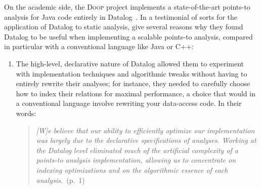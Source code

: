 
On the academic side, the \textsc{Doop} project implements a state-of-the-art
points-to analysis for Java code entirely in
Datalog~\citep{DBLP:conf/oopsla/BravenboerS09}.
%
In a testimonial of sorts for the application of Datalog to static analysis,
\citet{DBLP:conf/datalog/SmaragdakisB10} give several reasons why they found
Datalog to be useful when implementing a scalable points-to analysis, compared
in particular with a conventional language like Java or C++:

\begin{enumerate}

\item The high-level, declarative nature of Datalog allowed them to experiment
  with implementation techniques and algorithmic tweaks without having to
  entirely rewrite their analyses; for instance, they needed to carefully choose
  how to index their relations for maximal performance, a choice that would in a
  conventional language involve rewriting your data-access code.
%
  In their words:
  \begin{quote}
    \emph{[W]e believe that our ability to efficiently optimize our
      implementation was largely due to the declarative specifications of
      analyses. Working at the Datalog level eliminated much of the artificial
      complexity of a points-to analysis implementation, allowing us to
      concentrate on indexing optimizations and on the algorithmic essence of
      each analysis.}~(p.~1)
  \end{quote}
  


\end{enumerate}
